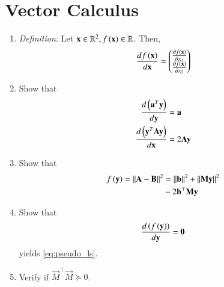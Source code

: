 \documentclass[journal,12pt,twocolumn]{IEEEtran}
\renewcommand\thesection{\arabic{section}}
\begin{document}
\section{Vector Calculus}
\begin{enumerate}[label=\thesection.\arabic*.,ref=\thesection.\theenumi]

\item {\em Definition: }Let $\mathbf{x} \in \mathbb{R}^2, f\left(\mathbf{x}\right) \in \mathbb{R}$.  Then, 
\begin{align}
\frac{df\left(\mathbf{x}\right)}{d\mathbf{x}} = \begin{pmatrix}\frac{\partial f(\mathbf{x})}{\partial x_1}\\\frac{\partial f(\mathbf{x})}{\partial x_2}\end{pmatrix}
\end{align}
\item Show that 
\begin{align}
\begin{split}
\frac{d\left(\mathbf{a}^T\mathbf{y}\right)}{d\mathbf{y}} &= \mathbf{a}
\\
\frac{d\left(\mathbf{y}^T\mathbf{A}\mathbf{y}\right)}{d\mathbf{x}} &= 2\mathbf{A}\mathbf{y}
\end{split}
\label{eq:calc_vec_diff}
\end{align}
\item Show that 
\begin{align}
	f\left(
\mathbf{y}
	\right)
	=
	\left\lVert
\mathbf{A}
-
	\mathbf{B}\right\rVert^2
&= 
\left\lVert\mathbf{b}\right\rVert^2 
	+ 
	\left\lVert  \mathbf{M}
	 \mathbf{y}\right\rVert^2
	 \\
	 &- 2\mathbf{b}^{\top}
	  \mathbf{M}
	  \mathbf{y}
\label{eq:pseudo_AB-dist}
\end{align}
\item Show that 
\begin{align}
	\frac{d\left(f\left(\mathbf{y}\right)\right)}{d\mathbf{y}} = \mathbf{0}
\end{align}
yields 
\eqref{eq:pseudo_ls}.
\item Verify if $\vec{M}^{\top}\vec{M} \succeq 0$.
\end{enumerate}
\end{document}
